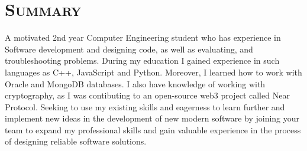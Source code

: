 \vspace*{-3em}
\section{\textsc{Summary}}

\qquad A motivated 2nd year Computer Engineering student who has experience in Software development and designing code, as well as evaluating, and troubleshooting problems. During my education I gained experience in such languages as C++, JavaScript and Python. Moreover, I learned how to work with Oracle and MongoDB databases. I also have knowledge of working with cryptography, as I was contibuting to an open-source web3 project called Near Protocol. Seeking to use my existing skills and eagerness to learn further and implement new ideas in the development of new modern software by joining your team to expand my professional skills and gain valuable experience in the process of designing reliable software solutions.
